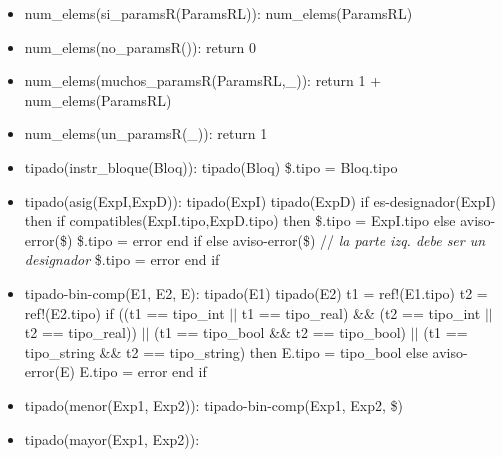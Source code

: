\documentclass[11pt]{article}
\begin{document}
\begin{itemize}
            \item num\_elems(si\_paramsR(ParamsRL)): 
                \subitem num\_elems(ParamsRL) 
            \item num\_elems(no\_paramsR()): 
                \subitem return 0
            \item num\_elems(muchos\_paramsR(ParamsRL,\_)): 
                \subitem return 1 + num\_elems(ParamsRL)
            \item num\_elems(un\_paramsR(\_)): 
                \subitem return 1
            \item tipado(instr\_bloque(Bloq)): 
                \subitem tipado(Bloq)
                \subitem \$.tipo = Bloq.tipo
            \item tipado(asig(ExpI,ExpD)): 
                \subitem tipado(ExpI) 
                \subitem tipado(ExpD) 
                \subitem if es-designador(ExpI) then
                    \subsubitem if compatibles(ExpI.tipo,ExpD.tipo) then 
                        \subsubitem \hspace{2em}
                        \$.tipo = ExpI.tipo
                    \subsubitem else 
                        \subsubitem \hspace{2em} aviso-error(\$)
                        \subsubitem \hspace{2em} \$.tipo = error 
                    \subsubitem end if 
                \subitem else 
                    \subsubitem aviso-error(\$) \/// \textit{la parte izq. debe ser un designador}
                    \subsubitem \$.tipo = error 
                \subitem end if
            \item tipado-bin-comp(E1, E2, E): 
                \subitem tipado(E1) 
                \subitem tipado(E2) 
                \subitem t1 = ref!(E1.tipo) 
                \subitem t2 = ref!(E2.tipo) 
                \subitem if ((t1 == tipo\_int $\vert \vert$ t1 == tipo\_real) \&\&  (t2 == tipo\_int $\vert \vert$ t2 == tipo\_real)) $\vert \vert$ 
                    (t1 == tipo\_bool \&\&  t2 == tipo\_bool) $\vert \vert$ 
                    (t1 == tipo\_string \&\&  t2 == tipo\_string) then
                    \subsubitem E.tipo = tipo\_bool
                \subitem else 
                    \subsubitem aviso-error(E)
                    \subsubitem E.tipo = error
                \subitem end if
            \item tipado(menor(Exp1, Exp2)):
                \subitem tipado-bin-comp(Exp1, Exp2, \$)
            \item tipado(mayor(Exp1, Exp2)): 

\end{itemize}
\end{document}

